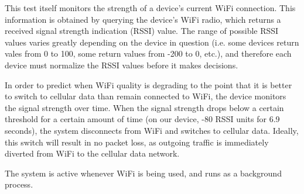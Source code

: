 This test itself monitors the strength of a device's current WiFi connection. This information is obtained by querying the device's WiFi radio, which returns a received signal strength indication (RSSI) value. The range of possible RSSI values varies greatly depending on the device in question (i.e. some devices return vales from 0 to 100, some return values from -200 to 0, etc.), and therefore each device must normalize the RSSI values before it makes decisions.

In order to predict when WiFi quality is degrading to the point that it is better to switch to cellular data than remain connected to WiFi, the device monitors the signal strength over time. When the signal strength drops below a certain threshold for a certain amount of time (on our device, -80 RSSI units for 6.9 seconds), the system disconnects from WiFi and switches to cellular data. Ideally, this switch will result in no packet loss, as outgoing traffic is immediately diverted from WiFi to the cellular data network.

The system is active whenever WiFi is being used, and runs as a background process.
